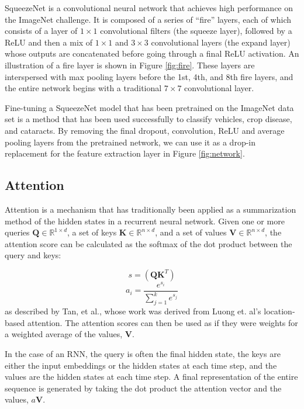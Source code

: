 \documentclass[conference]{IEEEtran}
\begin{document}
SqueezeNet is a convolutional neural network that achieves high performance on the ImageNet challenge. It is composed of a series of ``fire'' layers, each of which consists of a layer of $1 \times 1$ convolutional filters (the squeeze layer), followed by a ReLU and then a mix of $1 \times 1$ and $3 \times 3$ convolutional layers (the expand layer) whose outputs are concatenated before going through a final ReLU activation. An illustration of a fire layer is shown in Figure \ref{fig:fire}. These layers are interspersed with max pooling layers before the 1st, 4th, and 8th fire layers, and the entire network begins with a traditional $7 \times 7$ convolutional layer.

Fine-tuning a SqueezeNet model that has been pretrained on the ImageNet data set is a method that has been used successfully to classify vehicles\cite{agoes2017fine}, crop disease\cite{durmucs2017disease}, and cataracts\cite{qian2018machine}. By removing the final dropout, convolution, ReLU and average pooling layers from the pretrained network, we can use it as a drop-in replacement for the feature extraction layer in Figure \ref{fig:network}.

\subsection{Attention}
Attention is a mechanism that has traditionally been applied as a summarization method of the hidden states in a recurrent neural network. Given one or more queries $\textbf{Q} \in \mathbb{R}^{1 \times d}$, a set of keys $\textbf{K} \in \mathbb{R}^{n \times d}$, and a set of values $\textbf{V} \in \mathbb{R}^{n \times d}$, the attention score can be calculated as the softmax of the dot product between the query and keys:

$$s = (\textbf{Q}\textbf{K}^T)$$
$$a_i = \frac{e^{s_i}}{\sum_{j=1}^k e^{s_j}}$$
 as described by Tan, et al.\cite{tan2018deep}, whose work was derived from Luong et. al's location-based attention\cite{luong2015effective}. The attention scores can then be used as if they were weights for a weighted average of the values, $\textbf{V}$.

In the case of an RNN, the query is often the final hidden state, the keys are either the input embeddings or the hidden states at each time step, and the values are the hidden states at each time step. A final representation of the entire sequence is generated by taking the dot product the attention vector and the values, $a \textbf{V}$.
\end{document}
